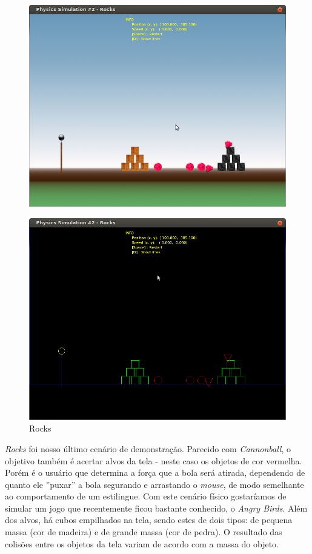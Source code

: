 \begin{figure}[H]
\centering
  \includegraphics[scale=0.4]{images/rocks.png}
\end{figure}
\begin{figure}[H]
\centering
  \includegraphics[scale=0.4]{images/rocksE.png}
  \caption{Rocks}
\end{figure}

\textit{Rocks} foi nosso último cenário de demonstração. Parecido com \textit{Cannonball}, o objetivo também é acertar alvos da tela - neste caso os objetos de cor vermelha. Porém é o usuário que determina a força que a bola será atirada, dependendo de quanto ele ''puxar'' a bola segurando e arrastando o \textit{mouse}, de modo semelhante ao comportamento de um estilingue. Com este cenário físico gostaríamos de simular um jogo que recentemente ficou bastante conhecido, o \textit{Angry Birds}. Além dos alvos, há cubos empilhados na tela, sendo estes de dois tipos: de pequena massa (cor de madeira) e de grande massa (cor de pedra). O resultado das colisões entre os objetos da tela variam de acordo com a massa do objeto. \\

